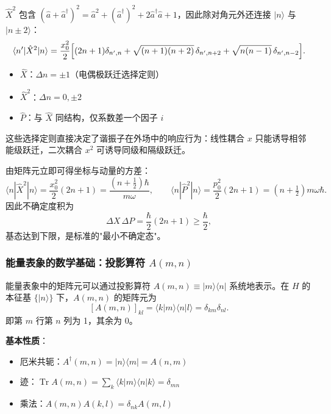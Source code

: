 $\hat{X}^2$ 包含 $(\hat{a}+\hat{a}^\dagger)^2 = \hat{a}^2 + (\hat{a}^\dagger)^2 + 2\hat{a}^\dagger\hat{a} + 1$，因此除对角元外还连接 $|n\rangle$ 与 $|n\pm 2\rangle$：
\begin{equation}
\langle n'|\hat{X}^2|n\rangle = \frac{x_0^2}{2}\Bigl[(2n+1)\delta_{n',n}
+ \sqrt{(n+1)(n+2)}\,\delta_{n',n+2}
+ \sqrt{n(n-1)}\,\delta_{n',n-2}\Bigr].
\end{equation}

\begin{tipbox}[矩阵元的选择定则]
\begin{itemize}[nosep]
    \item $\hat{X}$：$\Delta n = \pm 1$（电偶极跃迁选择定则）
    \item $\hat{X}^2$：$\Delta n = 0, \pm 2$
    \item $\hat{P}$：与 $\hat{X}$ 同结构，仅系数差一个因子 $i$
\end{itemize}
这些选择定则直接决定了谐振子在外场中的响应行为：线性耦合 $x$ 只能诱导相邻能级跃迁，二次耦合 $x^2$ 可诱导同级和隔级跃迁。
\end{tipbox}

由矩阵元立即可得坐标与动量的方差：
\[
\langle n|\hat{X}^2|n\rangle = \frac{x_0^2}{2}(2n+1) = \frac{(n+\tfrac12)\hbar}{m\omega},
\qquad
\langle n|\hat{P}^2|n\rangle = \frac{p_0^2}{2}(2n+1) = (n+\tfrac12)m\omega\hbar.
\]
因此不确定度积为
\[
\Delta X\,\Delta P = \frac{\hbar}{2}(2n+1) \geq \frac{\hbar}{2},
\]
基态达到下限，是标准的"最小不确定态"。

\subsubsection{能量表象的数学基础：投影算符 $A(m,n)$}

能量表象中的矩阵元可以通过投影算符 $A(m,n)\equiv|m\rangle\langle n|$ 系统地表示。在 $H$ 的本征基 $\{|n\rangle\}$ 下，$A(m,n)$ 的矩阵元为
\[
[A(m,n)]_{kl} = \langle k|m\rangle\langle n|l\rangle = \delta_{km}\delta_{nl}.
\]
即第 $m$ 行第 $n$ 列为 1，其余为 0。

\textbf{基本性质}：
\begin{itemize}[nosep]
    \item 厄米共轭：$A^\dagger(m,n) = |n\rangle\langle m| = A(n,m)$
    \item 迹：$\operatorname{Tr}A(m,n) = \sum_k\langle k|m\rangle\langle n|k\rangle = \delta_{mn}$
    \item 乘法：$A(m,n)A(k,l) = \delta_{nk}A(m,l)$
\end{itemize}

